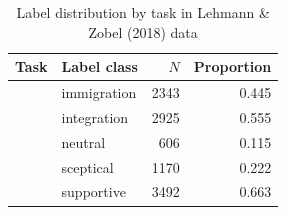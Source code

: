 \begin{table}[!t]

\caption{\label{tab:label_distribution_lehmann+zobel_2018}Label distribution by task in Lehmann \& Zobel (2018) data}
\centering
\fontsize{10}{12}\selectfont
\begin{tabular}[t]{>{\raggedright\arraybackslash}L{2.2in}lrr}
\toprule
\headrow Task & Label class & $N$ & Proportion\\
\midrule
 & immigration & 2343 & 0.445\\

 & integration & 2925 & 0.555\\
 & neutral & 606 & 0.115\\

 & sceptical & 1170 & 0.222\\

 & supportive & 3492 & 0.663\\
\bottomrule
\end{tabular}
\end{table}
